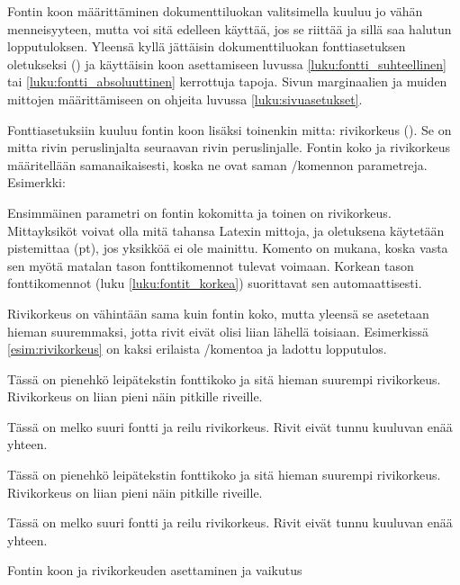 Fontin koon määrittäminen dokumenttiluokan valitsimella kuuluu jo vähän
menneisyyteen, mutta voi sitä edelleen käyttää, jos se riittää ja sillä
saa halutun lopputuloksen. Yleensä kyllä jättäisin dokumenttiluokan
fontti\-asetuksen oletukseksi (\koodi{10pt}) ja käyttäisin koon
asettamiseen luvussa \ref{luku:fontti_suhteellinen} tai
\ref{luku:fontti_absoluuttinen} kerrottuja tapoja. Sivun marginaalien ja
muiden mittojen määrittämiseen on ohjeita luvussa
\ref{luku:sivuasetukset}.

Fontti\-asetuksiin kuuluu fontin koon lisäksi toinenkin mitta:
rivikorkeus (). Se on mitta rivin
peruslinjalta seuraavan rivin peruslinjalle. Fontin koko ja rivikorkeus
määritellään saman\-aikaisesti, koska ne ovat saman \-/komennon parametreja. Esimerkki:

\begin{koodilohkosis}
  \fontsize{10pt}{12pt} \selectfont
\end{koodilohkosis}

Ensimmäinen parametri on fontin kokomitta ja toinen on rivikorkeus.
Mitta\-yksiköt voivat olla mitä tahansa Latexin mittoja, ja oletuksena
käytetään pistemittaa (pt), jos yksikköä ei ole mainittu. Komento
 on mukana, koska vasta sen myötä matalan tason
fonttikomennot tulevat voimaan. Korkean tason fonttikomennot (luku
\ref{luku:fontit_korkea}) suorittavat sen automaattisesti.

Rivikorkeus on vähintään sama kuin fontin koko, mutta yleensä se
asetetaan hieman suuremmaksi, jotta rivit eivät olisi liian lähellä
toisiaan. Esimerkissä \ref{esim:rivikorkeus} on kaksi erilaista
\-/komentoa ja ladottu lopputulos.

\begin{esimerkki}
\begin{koodilohko}
  \fontsize{10pt}{12pt}\selectfont Tässä on pienehkö leipätekstin
  fonttikoko ja sitä hieman suurempi rivikorkeus. Rivikorkeus on
  liian pieni näin pitkille riveille.

  \fontsize{16pt}{25pt}\selectfont Tässä on melko suuri fontti ja
  reilu rivikorkeus. Rivit eivät tunnu kuuluvan enää yhteen.
\end{koodilohko}
\centering%
\parbox{.9\textwidth}{%
  \linespread{1}
  \fontsize{10pt}{12pt}\selectfont Tässä on pienehkö leipätekstin
  fonttikoko ja sitä hieman suurempi rivikorkeus. Rivikorkeus on liian
  pieni näin pitkille riveille.

  \fontsize{16pt}{25pt}\selectfont Tässä on melko suuri fontti ja reilu
  rivikorkeus. Rivit eivät tunnu kuuluvan enää yhteen. } \vspace{3ex}
\caption{Fontin koon ja rivikorkeuden asettaminen ja vaikutus}
\label{esim:rivikorkeus}
\end{esimerkki}

